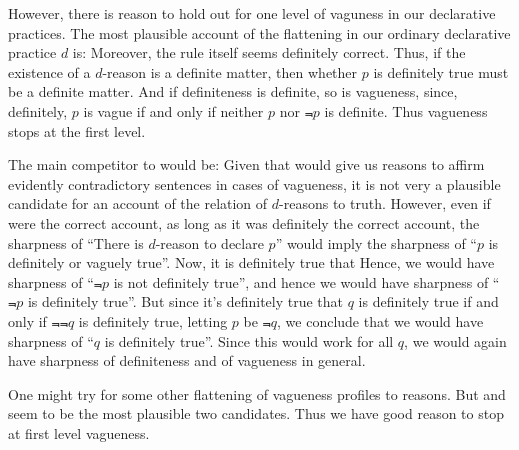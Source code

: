 However, there is reason to hold out for one level of vaguness in our declarative practices. The most plausible account of the flattening in 
our ordinary declarative practice $d$ is:
Moreover, the rule  itself seems definitely correct. Thus, if the existence of a $d$-reason is a definite matter,
then whether $p$ is definitely true must be a definite matter. And if definiteness is definite, so is vagueness, since, definitely,
$p$ is vague if and only if neither $p$ nor $\Not p$ is definite. Thus vagueness stops at the first level.

The main competitor to  would be:
Given that  would give us reasons to affirm evidently contradictory sentences in cases of vagueness, 
it is not very a plausible candidate for an account of the relation of $d$-reasons to truth. However, even if 
were the correct account, as long as it was definitely the correct account, the sharpness of ``There is $d$-reason to declare $p$''
would imply the sharpness of ``$p$ is definitely or vaguely true''. Now, it is definitely true that 
Hence, we would have sharpness of ``$\Not p$ is not definitely true'', and hence we would have sharpness of ``$\Not p$ is definitely
true''. But since it's definitely true that $q$ is definitely true if and only if $\Not\Not q$ is definitely true, letting $p$ be
$\Not q$, we conclude that we would have sharpness of ``$q$ is definitely true''. Since this would work for all $q$, we would again
have sharpness of definiteness and of vagueness in general.

One might try for some other flattening of vagueness profiles to reasons. But  and  seem to 
be the most plausible two candidates. Thus we have good reason to stop at first level vagueness.

